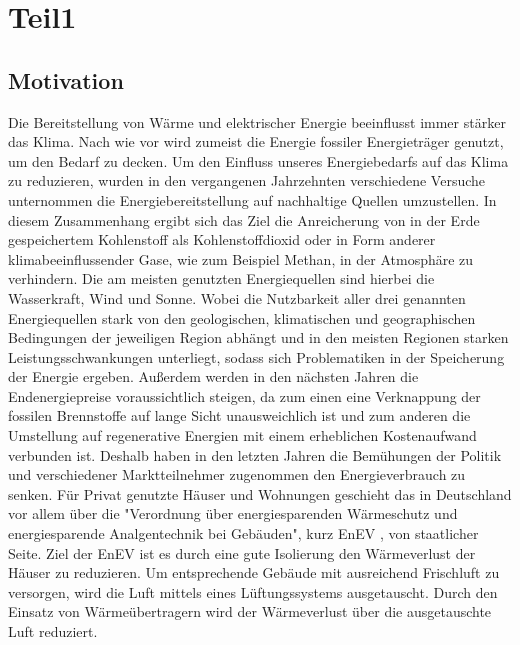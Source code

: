 \chapter{Teil1}
\label{cha:Teil1}

\begin{normalsize}
\begin{LARGE}

\section{Motivation}
\label{sec:Motivation}

Die Bereitstellung von Wärme und elektrischer Energie beeinflusst immer stärker das Klima. Nach wie vor wird zumeist die Energie fossiler Energieträger genutzt, um den Bedarf zu decken. Um den Einfluss unseres Energiebedarfs auf das Klima zu reduzieren, wurden in den vergangenen Jahrzehnten verschiedene Versuche unternommen die Energiebereitstellung auf nachhaltige Quellen umzustellen. In diesem Zusammenhang ergibt sich das Ziel die Anreicherung von in der Erde gespeichertem Kohlenstoff als Kohlenstoffdioxid oder in Form anderer klimabeeinflussender Gase, wie zum Beispiel Methan, in der Atmosphäre zu verhindern. 
Die am meisten genutzten Energiequellen sind hierbei die Wasserkraft, Wind und Sonne. Wobei die Nutzbarkeit aller drei genannten Energiequellen stark von den geologischen, klimatischen und geographischen Bedingungen der jeweiligen Region abhängt und in den meisten Regionen starken Leistungsschwankungen unterliegt, sodass sich Problematiken in der Speicherung der Energie ergeben. Außerdem werden in den nächsten Jahren die Endenergiepreise voraussichtlich steigen, da zum einen eine Verknappung der fossilen Brennstoffe auf lange Sicht unausweichlich ist und zum anderen die Umstellung auf regenerative Energien mit einem erheblichen Kostenaufwand verbunden ist.  Deshalb haben in den letzten Jahren die Bemühungen der Politik und verschiedener Marktteilnehmer zugenommen den Energieverbrauch zu senken. Für Privat genutzte Häuser und Wohnungen geschieht das in Deutschland vor allem über die "Verordnung über energiesparenden Wärmeschutz und energiesparende Analgentechnik bei Gebäuden", kurz EnEV \cite{.28.10.2015},  von staatlicher Seite. %
Ziel der EnEV ist es durch eine gute Isolierung den Wärmeverlust der Häuser zu reduzieren. Um entsprechende Gebäude mit ausreichend Frischluft zu versorgen, wird die Luft mittels eines Lüftungssystems ausgetauscht. Durch den Einsatz von Wärmeübertragern wird der Wärmeverlust über die ausgetauschte Luft reduziert. 


\end{LARGE}
\end{normalsize}

